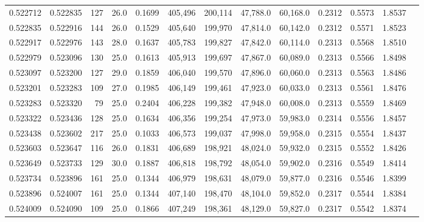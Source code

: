 \begin{tabular}{rrrrrrrrrrrrr}
0.522712 & 0.522835 &   127 & 26.0 &                                     0.1699 & 405,496 & 200,114 &  47,788.0 &  60,168.0 & 0.2312 & 0.5573 & 1.8537 \\
0.522835 & 0.522916 &   144 & 26.0 &                                     0.1529 & 405,640 & 199,970 &  47,814.0 &  60,142.0 & 0.2312 & 0.5571 & 1.8523 \\
0.522917 & 0.522976 &   143 & 28.0 &                                     0.1637 & 405,783 & 199,827 &  47,842.0 &  60,114.0 & 0.2313 & 0.5568 & 1.8510 \\
0.522979 & 0.523096 &   130 & 25.0 &                                     0.1613 & 405,913 & 199,697 &  47,867.0 &  60,089.0 & 0.2313 & 0.5566 & 1.8498 \\
0.523097 & 0.523200 &   127 & 29.0 &                                     0.1859 & 406,040 & 199,570 &  47,896.0 &  60,060.0 & 0.2313 & 0.5563 & 1.8486 \\
0.523201 & 0.523283 &   109 & 27.0 &                                     0.1985 & 406,149 & 199,461 &  47,923.0 &  60,033.0 & 0.2313 & 0.5561 & 1.8476 \\
0.523283 & 0.523320 &    79 & 25.0 &                                     0.2404 & 406,228 & 199,382 &  47,948.0 &  60,008.0 & 0.2313 & 0.5559 & 1.8469 \\
0.523322 & 0.523436 &   128 & 25.0 &                                     0.1634 & 406,356 & 199,254 &  47,973.0 &  59,983.0 & 0.2314 & 0.5556 & 1.8457 \\
0.523438 & 0.523602 &   217 & 25.0 &                                     0.1033 & 406,573 & 199,037 &  47,998.0 &  59,958.0 & 0.2315 & 0.5554 & 1.8437 \\
0.523603 & 0.523647 &   116 & 26.0 &                                     0.1831 & 406,689 & 198,921 &  48,024.0 &  59,932.0 & 0.2315 & 0.5552 & 1.8426 \\
0.523649 & 0.523733 &   129 & 30.0 &                                     0.1887 & 406,818 & 198,792 &  48,054.0 &  59,902.0 & 0.2316 & 0.5549 & 1.8414 \\
0.523734 & 0.523896 &   161 & 25.0 &                                     0.1344 & 406,979 & 198,631 &  48,079.0 &  59,877.0 & 0.2316 & 0.5546 & 1.8399 \\
0.523896 & 0.524007 &   161 & 25.0 &                                     0.1344 & 407,140 & 198,470 &  48,104.0 &  59,852.0 & 0.2317 & 0.5544 & 1.8384 \\
0.524009 & 0.524090 &   109 & 25.0 &                                     0.1866 & 407,249 & 198,361 &  48,129.0 &  59,827.0 & 0.2317 & 0.5542 & 1.8374 \\

\end{tabular}
